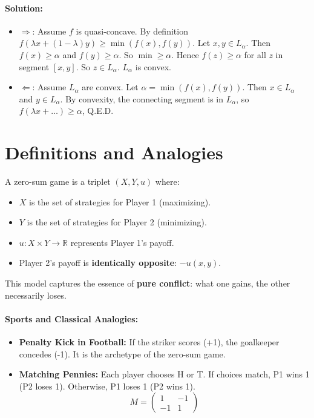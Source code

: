 \paragraph{Solution:}
\begin{itemize}
    \item $\Rightarrow$: Assume $f$ is quasi-concave. By definition $f(\lambda x + (1-\lambda)y) \ge \min(f(x), f(y))$.
    Let $x, y \in L_\alpha$. Then $f(x) \ge \alpha$ and $f(y) \ge \alpha$. So $\min \ge \alpha$.
    Hence $f(z) \ge \alpha$ for all $z$ in segment $[x,y]$. So $z \in L_\alpha$. $L_\alpha$ is convex.
    \item $\Leftarrow$: Assume $L_\alpha$ are convex.
    Let $\alpha = \min(f(x), f(y))$. Then $x \in L_\alpha$ and $y \in L_\alpha$.
    By convexity, the connecting segment is in $L_\alpha$, so $f(\lambda x + \dots) \ge \alpha$, Q.E.D.
\end{itemize}

\section{Definitions and Analogies}

\begin{definition}
A zero-sum game is a triplet $(X, Y, u)$ where:
\begin{itemize}
    \item $X$ is the set of strategies for Player 1 (maximizing).
    \item $Y$ is the set of strategies for Player 2 (minimizing).
    \item $u: X \times Y \rightarrow \mathbb{R}$ represents Player 1's payoff.
    \item Player 2's payoff is \textbf{identically opposite}: $-u(x, y)$.
\end{itemize}
This model captures the essence of \textbf{pure conflict}: what one gains, the other necessarily loses.
\end{definition}

\paragraph{Sports and Classical Analogies:}
\begin{itemize}
    \item \textbf{Penalty Kick in Football:} If the striker scores (+1), the goalkeeper concedes (-1). It is the archetype of the zero-sum game.
    \item \textbf{Matching Pennies:} Each player chooses H or T. If choices match, P1 wins 1 (P2 loses 1). Otherwise, P1 loses 1 (P2 wins 1).
    $$M = \begin{pmatrix} 1 & -1 \\ -1 & 1 \end{pmatrix}$$
\end{itemize}

